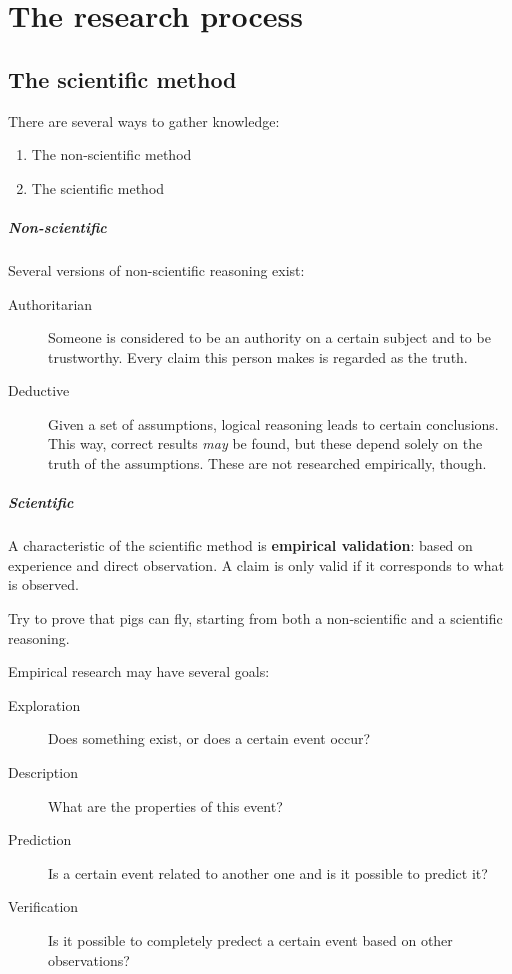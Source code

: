 \chapter{The research process}
\section{The scientific method}

There are several ways to gather knowledge:

\begin{enumerate}
	\item The non-scientific method
	\item The scientific method
\end{enumerate}

\paragraph{Non-scientific} Several versions of non-scientific reasoning exist:
\begin{description}
	\item [Authoritarian] Someone is considered to be an authority on a certain subject and to be trustworthy. Every claim this person makes is regarded as the truth.
	\item [Deductive] Given a set of assumptions, logical reasoning leads to certain conclusions. This way, correct results \emph{may} be found, but these depend solely on the truth of the assumptions. These are not researched empirically, though.
\end{description}

\paragraph{Scientific} A characteristic of the scientific method is \textbf{empirical validation}: based on experience and direct observation. A claim is only valid if it corresponds to what is observed.

\begin{exercise}
Try to prove that pigs can fly, starting from both a non-scientific and a scientific reasoning.
\end{exercise}

Empirical research may have several goals:

\begin{description}
    \item[Exploration] Does something exist, or does a certain event occur?
    \item[Description] What are the properties of this event?
    \item[Prediction] Is a certain event related to another one and is it possible to predict it?
    \item[Verification] Is it possible to completely predect a certain event based on other observations?
\end{description}

